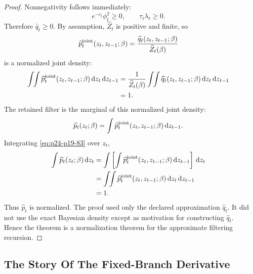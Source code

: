 \documentclass[11pt]{article}
\numberwithin{equation}{section}
\newcommand{\dd}{\,\mathrm d}
\begin{document}
\begin{proof}
Nonnegativity follows immediately:
\begin{equation}
    e^{-c_t}\phi_t^2\ge0,
    \qquad
    \tau_t\lambda_t\ge0.
    \label{eq:p24-p19-80}
\end{equation}
Therefore \(\widehat q_t\ge0\).  By assumption,
\(\widehat Z_t\) is positive and finite, so
\begin{equation}
    \widehat p_t^{\rm joint}(z_t,z_{t-1};\beta)
    =
    \frac{\widehat q_t(z_t,z_{t-1};\beta)}
    {\widehat Z_t(\beta)}
    \label{eq:p24-p19-81}
\end{equation}
is a normalized joint density:
\begin{equation}
\begin{aligned}
    \int\!\!\int
    \widehat p_t^{\rm joint}(z_t,z_{t-1};\beta)
    \dd z_t\dd z_{t-1}
    &=
    \frac{1}{\widehat Z_t(\beta)}
    \int\!\!\int
    \widehat q_t(z_t,z_{t-1};\beta)
    \dd z_t\dd z_{t-1}\\
    &=
    1.
\end{aligned}
\label{eq:p24-p19-82}
\end{equation}
The retained filter is the marginal of this normalized joint density:
\begin{equation}
    \widehat p_t(z_t;\beta)
    =
    \int
    \widehat p_t^{\rm joint}(z_t,z_{t-1};\beta)
    \dd z_{t-1}.
    \label{eq:p24-p19-83}
\end{equation}
Integrating \eqref{eq:p24-p19-83} over \(z_t\),
\begin{equation}
\begin{aligned}
    \int \widehat p_t(z_t;\beta)\dd z_t
    &=
    \int
    \left[
    \int \widehat p_t^{\rm joint}(z_t,z_{t-1};\beta)
    \dd z_{t-1}
    \right]\dd z_t\\
    &=
    \int\!\!\int
    \widehat p_t^{\rm joint}(z_t,z_{t-1};\beta)
    \dd z_t\dd z_{t-1}\\
    &=
    1.
\end{aligned}
\label{eq:p24-p19-84}
\end{equation}
Thus \(\widehat p_t\) is normalized.  The proof used only the declared
approximation \(\widehat q_t\).  It did not use the exact Bayesian density
except as motivation for constructing \(\widehat q_t\).  Hence the theorem is a
normalization theorem for the approximate filtering recursion.
\end{proof}

\subsection{The Story Of The Fixed-Branch Derivative}
\end{document}
